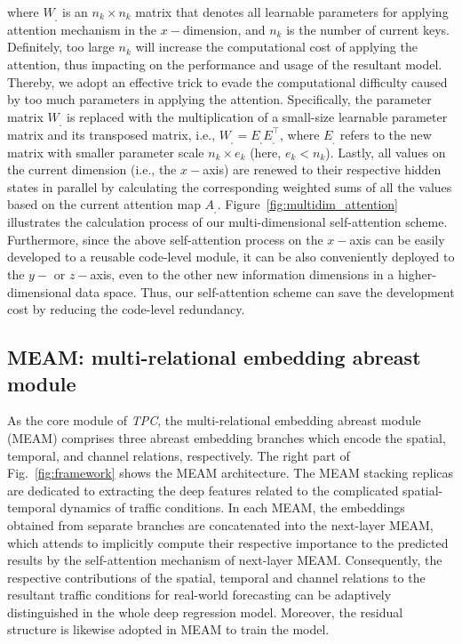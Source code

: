 where $W_{_\square}$ is an $n_k \times n_k$ matrix that denotes all learnable parameters for applying attention mechanism in the $x-$dimension, and $n_k$ is the number of current keys. Definitely, too large $n_k$ will increase the computational cost of applying the attention, thus impacting on the performance and usage of the resultant model. Thereby, we adopt an effective trick to evade the computational difficulty caused by too much parameters in applying the attention. Specifically, the parameter matrix $W_{_\square}$ is replaced with the multiplication of a small-size learnable parameter matrix and its transposed matrix, i.e., $W_{_\square} = E_{_\square} E_{_\square}^\top$, where $E_{_\square}$ refers to the new matrix with smaller parameter scale $n_k \times e_k$ (here, $e_k < n_k$). Lastly, all values on the current dimension (i.e., the $x-$axis) are renewed to their respective hidden states in parallel by calculating the corresponding weighted sums of all the values based on the current attention map $A_{_\square}$. Figure~\ref{fig:multidim_attention} illustrates the calculation process of our multi-dimensional self-attention scheme. Furthermore, since the above self-attention process on the $x-$axis can be easily developed to a reusable code-level module, it can be also conveniently deployed to the $y-$ or $z-$axis, even to the other new information dimensions in a higher-dimensional data space. Thus, our self-attention scheme can save the development cost by reducing the code-level redundancy.

\subsection{MEAM: multi-relational embedding abreast module}
As the core module of \textit{TPC}, the multi-relational embedding abreast module (MEAM) comprises three abreast embedding branches which encode the spatial, temporal, and channel relations, respectively. The right part of Fig.~\ref{fig:framework} shows the MEAM architecture. The MEAM stacking replicas are dedicated to extracting the deep features related to the complicated spatial-temporal dynamics of traffic conditions. In each MEAM, the embeddings obtained from separate branches are concatenated into the next-layer MEAM, which attends to implicitly compute their respective importance to the predicted results by the self-attention mechanism of next-layer MEAM. Consequently, the respective contributions of the spatial, temporal and channel relations to the resultant traffic conditions for real-world forecasting can be adaptively distinguished in the whole deep regression model. Moreover, the residual structure \cite{he2016deep} is likewise adopted in MEAM to train the model.

